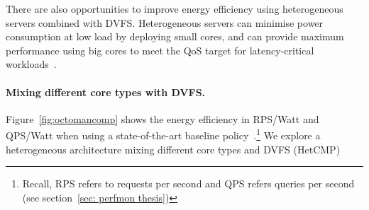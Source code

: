 There are also opportunities to improve energy efficiency using heterogeneous servers
combined with DVFS. Heterogeneous servers can minimise power consumption at low load by
deploying small cores, and can provide maximum performance using big cores to meet the QoS
target for latency-critical workloads~\citep{Petrucci2015Octopus-Man:Computers,
JanapaReddi2010WebCores, Chitlur2012QuickIA:Prototypes}.

\paragraph{Mixing different core types with DVFS.} Figure~\ref{fig:octomancomp} shows the
energy efficiency in RPS/Watt and QPS/Watt when using a state-of-the-art baseline
policy~\citep{Petrucci2015Octopus-Man:Computers}.\footnote{Recall, RPS refers to requests
per second and QPS refers queries per second (see section~\ref{sec: perfmon thesis})} We
explore a heterogeneous architecture mixing different core types and DVFS (HetCMP) 

